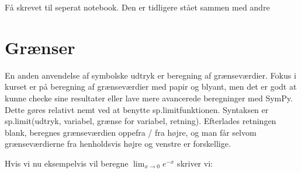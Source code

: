 \documentclass[letterpaper,10pt,english]{jupyterBook}
\begin{document}
\noindent{}

\noindent{}

\noindent{}

Få skrevet til seperat notebook. Den er tidligere stået sammen med andre


\section{Grænser}
\label{\detokenize{notebooks/sympy/Notebook2_limits:graenser}}\label{\detokenize{notebooks/sympy/Notebook2_limits::doc}}
En anden anvendelse af symbolske udtryk er beregning af grænseværdier. Fokus i kurset er på beregning af grænseværdier med papir og blyant, men det er godt at kunne checke sine resultater eller lave mere avancerede beregninger med SymPy. Dette gøres relativt nemt ved at benytte sp.limit\sphinxhyphen{}funktionen. Syntaksen er
sp.limit(udtryk, variabel, grænse for variabel, retning). Efterlades retningen blank, beregnes grænseværdien oppefra / fra højre, og man får  selvom grænseværdierne fra henholdsvis højre og venstre er forskellige.

Hvis vi nu eksempelvis vil beregne \(\lim_{x\to 0} e^{-x}\) skriver vi:

\begin{sphinxVerbatim}[commandchars=\\\{\}]
   
   
   
\end{sphinxVerbatim}

\begin{sphinxVerbatim}[commandchars=\\\{\}]
                      
      
      
\end{sphinxVerbatim}
\end{document}
